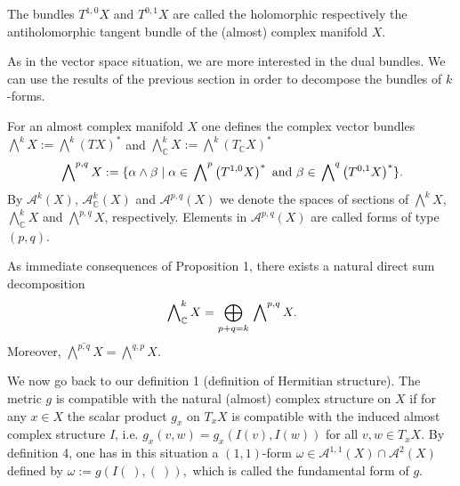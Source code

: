 \documentclass{ctexart}
\begin{document}
\begin{definition}
  The bundles $T^{1,0} X$ and $T^{0,1} X$ are called the holomorphic respectively the antiholomorphic tangent bundle of the (almost) complex manifold $X$.
\end{definition}


As in the vector space situation, we are more interested in the dual bundles. We can use the results of the previous section in order to decompose the bundles of $k$-forms.

\begin{definition}
  For an almost complex manifold $X$ one defines the complex vector bundles $\bigwedge^k X:=\bigwedge^k\left(T X\right)^*$ and 
  $\bigwedge_\mathbb{C}^k X:=\bigwedge^k\left(T_{\mathbb{C}} X\right)^*$
  $$
  \sideset{}{^{p, q}}\bigwedge X:=\{\alpha\wedge\beta\mid\alpha\in\sideset{}{^{p}}\bigwedge\left(T^{1,0} X\right)^*\text{ and }\beta\in\sideset{}{^{q}}\bigwedge\left(T^{0,1} X\right)^*\}. 
  $$
  By $\mathcal{A}^k(X)$, $\mathcal{A}_{\mathbb{C}}^k(X)$ and $\mathcal{A}^{p, q}(X)$ we denote the spaces of sections of $\bigwedge^k X$, $\bigwedge_{\mathbb{C}}^k X$ and 
  $\bigwedge^{p, q} X$, respectively. Elements in $\mathcal{A}^{p, q}(X)$ are called forms of type $(p, q)$.
\end{definition}

As immediate consequences of Proposition 1, there exists a natural direct sum decomposition
$$
\sideset{}{_\mathbb{C}^k}\bigwedge X=\bigoplus_{p+q=k} \sideset{}{^{p, q}}\bigwedge X. 
$$
Moreover, $\overline{\bigwedge^{p, q} X}=\bigwedge^{q, p} X$.


We now go back to our definition 1 (definition of Hermitian structure). The metric $g$ is compatible with the natural (almost) complex structure on $X$ if for any $x \in X$ the scalar product $g_{x}$ on $T_{x} X$ 
is compatible with the induced almost complex structure $I$, i.e. $g_{x}(v, w)=g_{x}(I(v), I(w))$ for all $v, w \in T_{x} X$. By definition 4, one has in this situation a $(1,1)$-form 
$\omega \in \mathcal{A}^{1,1}(X) \cap \mathcal{A}^{2}(X)$ defined by $\omega:=g(I(\ ),(\ )),$ which is called the fundamental form of $g$. 
\end{document}
